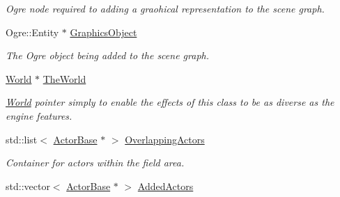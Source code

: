\begin{DoxyCompactItemize}
\begin{DoxyCompactList}\small\item\em Ogre node required to adding a graohical representation to the scene graph. \item\end{DoxyCompactList}\item 
\hypertarget{classphys_1_1AreaEffect_a31b755c85d318438e42e300de56d2e5c}{
Ogre::Entity $\ast$ \hyperlink{classphys_1_1AreaEffect_a31b755c85d318438e42e300de56d2e5c}{GraphicsObject}}
\label{d4/d55/classphys_1_1AreaEffect_a31b755c85d318438e42e300de56d2e5c}

\begin{DoxyCompactList}\small\item\em The Ogre object being added to the scene graph. \item\end{DoxyCompactList}\item 
\hypertarget{classphys_1_1AreaEffect_a3008e8e90236141ca4c21a9580e6f5de}{
\hyperlink{classphys_1_1World}{World} $\ast$ \hyperlink{classphys_1_1AreaEffect_a3008e8e90236141ca4c21a9580e6f5de}{TheWorld}}
\label{d4/d55/classphys_1_1AreaEffect_a3008e8e90236141ca4c21a9580e6f5de}

\begin{DoxyCompactList}\small\item\em \hyperlink{classphys_1_1World}{World} pointer simply to enable the effects of this class to be as diverse as the engine features. \item\end{DoxyCompactList}\item 
\hypertarget{classphys_1_1AreaEffect_a45834591f0ea49ba6657ce58d070ee9b}{
std::list$<$ \hyperlink{classphys_1_1ActorBase}{ActorBase} $\ast$ $>$ \hyperlink{classphys_1_1AreaEffect_a45834591f0ea49ba6657ce58d070ee9b}{OverlappingActors}}
\label{d4/d55/classphys_1_1AreaEffect_a45834591f0ea49ba6657ce58d070ee9b}

\begin{DoxyCompactList}\small\item\em Container for actors within the field area. \item\end{DoxyCompactList}\item 
\hypertarget{classphys_1_1AreaEffect_a5bd2ad15db98ecc140a8bf2fee8d0c1f}{
std::vector$<$ \hyperlink{classphys_1_1ActorBase}{ActorBase} $\ast$ $>$ \hyperlink{classphys_1_1AreaEffect_a5bd2ad15db98ecc140a8bf2fee8d0c1f}{AddedActors}}
\label{d4/d55/classphys_1_1AreaEffect_a5bd2ad15db98ecc140a8bf2fee8d0c1f}


\end{DoxyCompactItemize}
